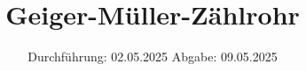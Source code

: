 

\subject{v703}
\title{Geiger-Müller-Zählrohr}
\date{%
  Durchführung: 02.05.2025
  \hspace{3em}
  Abgabe: 09.05.2025
}



\maketitle
\thispagestyle{empty}
\tableofcontents
\newpage






\printbibliography{}


